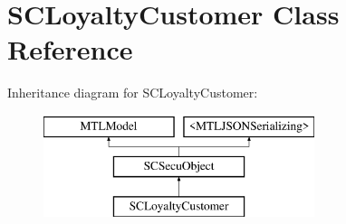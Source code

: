 \hypertarget{interface_s_c_loyalty_customer}{}\section{S\+C\+Loyalty\+Customer Class Reference}
\label{interface_s_c_loyalty_customer}
Inheritance diagram for S\+C\+Loyalty\+Customer\+:\begin{figure}[H]
\begin{center}
\leavevmode
\includegraphics[height=3.000000cm]{interface_s_c_loyalty_customer}
\end{center}
\end{figure}
